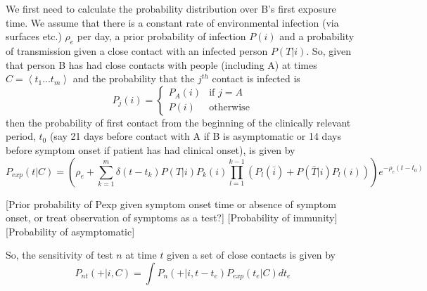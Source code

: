 \documentclass{article}
\begin{document}
We first need to calculate the probability distribution over B's first exposure time. We assume that there is a constant rate of environmental infection (via surfaces etc.) $\rho_e$ per day, a prior probability of infection $P(i)$ and a probability of transmission given a close contact with an infected person $P(T|i)$. So, given that person B has had close contacts with people (including A) at times $C = \left<t_1...t_m\right>$ and the probability that the $j^{th}$ contact is infected is
\[
P_j(i) =
\begin{cases}
P_A(i) & \text{if }j=A \\
P(i) & \text{otherwise}
\end{cases}
\]
then the probability of first contact from the beginning of the clinically relevant period, $t_0$ (say 21 days before contact with A if B is asymptomatic or 14 days before symptom onset if patient has had clinical onset), is given by
\[
P_{exp}(t|C) = \left(\rho_e + \sum_{k=1}^m \delta(t-t_k)P(T|i)P_k(i)\prod_{l=1}^{k-1}\left(P_l(\bar{i}) + P(\bar{T}|i)P_l(i)\right)\right)e^{-\rho_e(t-t_0)} 
\]

[Prior probability of Pexp given symptom onset time or absence of symptom onset, or treat observation of symptoms as a test?]
[Probability of immunity]
[Probability of asymptomatic]

So, the sensitivity of test $n$ at time $t$ given a set of close contacts is given by
\[
P_{nt}(+|i,C) = \int P_n(+|i,t-t_e)P_{exp}(t_e|C) dt_e
\]


%

%
%
% 
%

\end{document}
